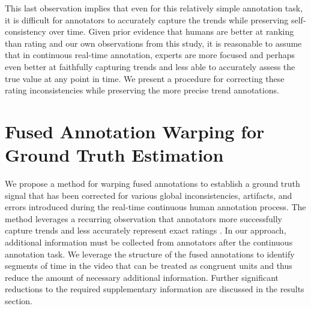 \documentclass[times,twocolumn,final,authoryear]{elsarticle}
\begin{document}
This last observation implies that even for this relatively simple annotation task, it is difficult for annotators to accurately capture the trends while preserving self-consistency over time.  Given prior evidence that humans are better at ranking than rating \citep{Yannakakis2011, metallinou2013annotation, yannakakis2015ratings} and our own observations from this study, it is reasonable to assume that in continuous real-time annotation, experts are more focused and perhaps even better at faithfully capturing trends and less able to accurately assess the true value at any point in time.  We present a procedure for correcting these rating inconsistencies while preserving the more precise trend annotations.

\section{Fused Annotation Warping for Ground Truth Estimation}

We propose a method for warping fused annotations to establish a ground truth signal that has been corrected for various global inconsistencies, artifacts, and errors introduced during the real-time continuous human annotation process.  The method leverages a recurring observation that annotators more successfully capture trends and less accurately represent exact ratings \citep{Yannakakis2011, metallinou2013annotation, yannakakis2015ratings}.  In our approach, additional information must be collected from annotators after the continuous annotation task.  We leverage the structure of the fused annotations to identify segments of time in the video that can be treated as congruent units and thus reduce the amount of necessary additional information.  Further significant reductions to the required supplementary information are discussed in the results section.
\end{document}
